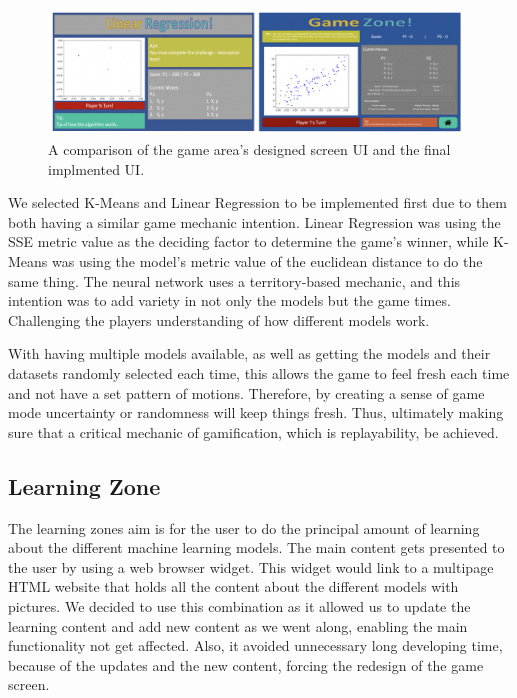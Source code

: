		\begin{figure}[t]
			\begin{center}
				\includegraphics[width=11cm]{graphics/game_zone.png}
				\caption{A comparison of the game area's designed screen UI and the final implmented UI.}
				\label{fig:ui_ga}
			\end{center}
		\end{figure}
		
		
		We selected K-Means and Linear Regression to be implemented first due to them both having a similar game mechanic intention. Linear Regression was using the SSE metric value as the deciding factor to determine the game's winner, while K-Means was using the model's metric value of the euclidean distance to do the same thing. The neural network uses a territory-based mechanic, and this intention was to add variety in not only the models but the game times. Challenging the players understanding of how different models work.
		
		With having multiple models available, as well as getting the models and their datasets randomly selected each time, this allows the game to feel fresh each time and not have a set pattern of motions. Therefore, by creating a sense of game mode uncertainty or randomness will keep things fresh. Thus, ultimately making sure that a critical mechanic of gamification, which is replayability, be achieved.  
		
	
	\subsection{Learning Zone}
	
	The learning zones aim is for the user to do the principal amount of learning about the different machine learning models. The main content gets presented to the user by using a web browser widget. This widget would link to a multipage HTML website that holds all the content about the different models with pictures. We decided to use this combination as it allowed us to update the learning content and add new content as we went along, enabling the main functionality not get affected. Also, it avoided unnecessary long developing time, because of the updates and the new content, forcing the redesign of the game screen. 
	
